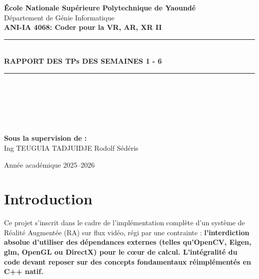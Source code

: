 \documentclass[12pt,a4paper]{report}
\begin{document}

\begin{titlepage}
\begin{center}
\vspace*{5cm}


\textbf{\Large École Nationale Supérieure Polytechnique de Yaoundé}\\
Département de Génie Informatique\\[1cm]


\textbf{ANI-IA 4068: Coder pour la VR, AR, XR II}\\[1cm]

\rule{\textwidth}{0.5pt}\\
{\LARGE \textbf{RAPPORT DES TPs DES SEMAINES 1 - 6}}\\
\rule{\textwidth}{0.5pt}\\[2cm]

\end{center}
\begin{center}
\begin{flushleft}

\\
\\
\\[1cm]
\end{flushleft}

\begin{flushleft}
\textbf{Sous la supervision de :}\\
Ing TEUGUIA TADJUIDJE Rodolf Sédéris
\end{flushleft}

\vfill
Année académique 2025--2026
\end{center}
\end{titlepage}



\tableofcontents
\clearpage
{}



\chapter*{Introduction}

Ce projet s'inscrit dans le cadre de l'implémentation complète d'un système de Réalité Augmentée (RA) sur flux vidéo, régi par une contrainte : \textbf{l'interdiction absolue d'utiliser des dépendances externes (telles qu'OpenCV, Eigen, glm, OpenGL ou DirectX) pour le cœur de calcul. L'intégralité du code devant reposer sur des concepts fondamentaux réimplémentés en C++ natif.}
\end{document}
